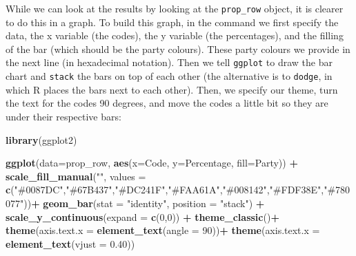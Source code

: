 \documentclass[
]{book}
\newenvironment{Shaded}{\begin{snugshade}}{\end{snugshade}}
\newcommand{\AttributeTok}[1]{\textcolor[rgb]{0.13,0.29,0.53}{#1}}
\newcommand{\DecValTok}[1]{\textcolor[rgb]{0.00,0.00,0.81}{#1}}
\newcommand{\FloatTok}[1]{\textcolor[rgb]{0.00,0.00,0.81}{#1}}
\newcommand{\FunctionTok}[1]{\textcolor[rgb]{0.13,0.29,0.53}{\textbf{#1}}}
\newcommand{\NormalTok}[1]{#1}
\newcommand{\OtherTok}[1]{\textcolor[rgb]{0.56,0.35,0.01}{#1}}
\newcommand{\SpecialCharTok}[1]{\textcolor[rgb]{0.81,0.36,0.00}{\textbf{#1}}}
\newcommand{\StringTok}[1]{\textcolor[rgb]{0.31,0.60,0.02}{#1}}
\begin{document}
\begin{Shaded}
\end{Shaded}

While we can look at the results by looking at the \texttt{prop\_row} object, it is clearer to do this in a graph. To build this graph, in the command we first specify the data, the x variable (the codes), the y variable (the percentages), and the filling of the bar (which should be the party colours). These party colours we provide in the next line (in hexadecimal notation). Then we tell \texttt{ggplot} to draw the bar chart and \texttt{stack} the bars on top of each other (the alternative is to \texttt{dodge}, in which R places the bars next to each other). Then, we specify our theme, turn the text for the codes 90 degrees, and move the codes a little bit so they are under their respective bars:

\begin{Shaded}
\begin{Highlighting}[]
\FunctionTok{library}\NormalTok{(ggplot2)}

\FunctionTok{ggplot}\NormalTok{(}\AttributeTok{data=}\NormalTok{prop\_row, }\FunctionTok{aes}\NormalTok{(}\AttributeTok{x=}\NormalTok{Code, }\AttributeTok{y=}\NormalTok{Percentage, }\AttributeTok{fill=}\NormalTok{Party)) }\SpecialCharTok{+}
 \FunctionTok{scale\_fill\_manual}\NormalTok{(}\StringTok{""}\NormalTok{, }\AttributeTok{values =} \FunctionTok{c}\NormalTok{(}\StringTok{"\#0087DC"}\NormalTok{,}\StringTok{"\#67B437"}\NormalTok{,}\StringTok{"\#DC241F"}\NormalTok{,}\StringTok{"\#FAA61A"}\NormalTok{,}\StringTok{"\#008142"}\NormalTok{,}\StringTok{"\#FDF38E"}\NormalTok{,}\StringTok{"\#780077"}\NormalTok{))}\SpecialCharTok{+}
 \FunctionTok{geom\_bar}\NormalTok{(}\AttributeTok{stat =} \StringTok{"identity"}\NormalTok{, }\AttributeTok{position =} \StringTok{"stack"}\NormalTok{) }\SpecialCharTok{+}
 \FunctionTok{scale\_y\_continuous}\NormalTok{(}\AttributeTok{expand =} \FunctionTok{c}\NormalTok{(}\DecValTok{0}\NormalTok{,}\DecValTok{0}\NormalTok{)) }\SpecialCharTok{+}
 \FunctionTok{theme\_classic}\NormalTok{()}\SpecialCharTok{+}
 \FunctionTok{theme}\NormalTok{(}\AttributeTok{axis.text.x =} \FunctionTok{element\_text}\NormalTok{(}\AttributeTok{angle =} \DecValTok{90}\NormalTok{))}\SpecialCharTok{+}
 \FunctionTok{theme}\NormalTok{(}\AttributeTok{axis.text.x =} \FunctionTok{element\_text}\NormalTok{(}\AttributeTok{vjust =} \FloatTok{0.40}\NormalTok{))}
\end{Highlighting}
\end{Shaded}
\end{document}
